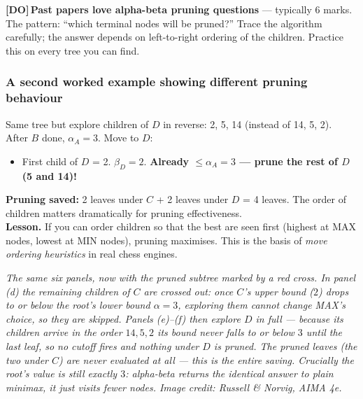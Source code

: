 \documentclass[11pt, a4paper]{article}
\newcommand{\doflag}{\textcolor{defBd}{\textbf{[DO]}}\,}
\begin{document}
\doflag{}\textbf{Past papers love alpha-beta pruning questions} — typically 6 marks. The pattern: ``which terminal nodes will be pruned?'' Trace the algorithm carefully; the answer depends on left-to-right ordering of the children. Practice this on every tree you can find.

\subsubsection*{A second worked example showing different pruning behaviour}

\begin{exbox}
Same tree but explore children of $D$ in reverse: 2, 5, 14 (instead of 14, 5, 2).\\[0.3em]
After $B$ done, $\alpha_A = 3$. Move to $D$:
\begin{itemize}[itemsep=0pt, topsep=0pt]
  \item First child of $D$ = 2. $\beta_D = 2$. \textbf{Already $\le \alpha_A = 3$ — prune the rest of $D$ (5 and 14)!}
\end{itemize}
\textbf{Pruning saved:} 2 leaves under $C$ + 2 leaves under $D$ = 4 leaves. The order of children matters dramatically for pruning effectiveness.\\[0.3em]
\textbf{Lesson.} If you can order children so that the best are seen first (highest at MAX nodes, lowest at MIN nodes), pruning maximises. This is the basis of \emph{move ordering heuristics} in real chess engines.
\end{exbox}

\begin{center}

\footnotesize\textit{The same six panels, now with the pruned subtree marked by a red cross. In panel (d) the remaining children of $C$ are crossed out: once $C$'s upper bound ($2$) drops to or below the root's lower bound $\alpha=3$, exploring them cannot change MAX's choice, so they are skipped. Panels (e)--(f) then explore $D$ in full --- because its children arrive in the order $14, 5, 2$ its bound never falls to or below $3$ until the last leaf, so no cutoff fires and nothing under $D$ is pruned. The pruned leaves (the two under $C$) are never evaluated at all --- this is the entire saving. Crucially the root's value is still exactly $3$: alpha-beta returns the identical answer to plain minimax, it just visits fewer nodes. Image credit: Russell \& Norvig, AIMA 4e.}
\end{center}
\end{document}
